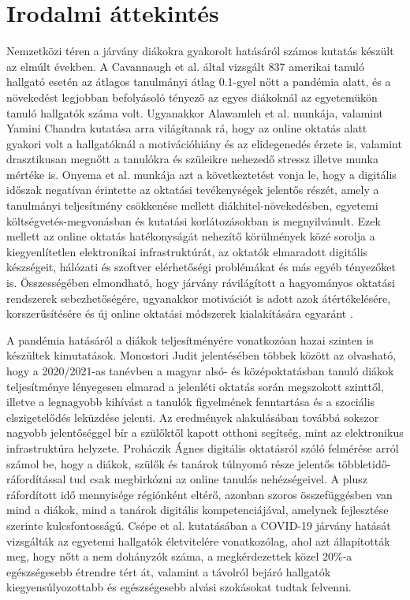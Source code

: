 \documentclass[12pt]{article}
\begin{document}
\newpage

\section{Irodalmi áttekintés}

Nemzetközi téren a járvány diákokra gyakorolt hatásáról számos kutatás készült az elmúlt években. A Cavannaugh et al. \cite{student_perf1} által vizsgált 837 amerikai tanuló hallgató esetén az átlagos tanulmányi átlag 0.1-gyel nőtt a pandémia alatt, és a növekedést legjobban befolyásoló tényező az egyes diákoknál az egyetemükön tanuló hallgatók száma volt. Ugyanakkor Alawamleh et al. \cite{student_perf8} munkája, valamint Yamini Chandra \cite{student_perf6} kutatása arra világítanak rá, hogy az online oktatás alatt gyakori volt a hallgatóknál a motivációhiány és az elidegenedés érzete is, valamint drasztikusan megnőtt a tanulókra és szüleikre nehezedő stressz illetve munka mértéke is.
Onyema et al. \cite{student_perf5} munkája azt a következtetést vonja le, hogy a digitális időszak negatívan érintette az oktatási tevékenységek jelentős részét, amely a tanulmányi teljesítmény csökkenése mellett diákhitel-növekedésben, egyetemi költségvetés-megvonásban és kutatási korlátozásokban is megnyilvánult. Ezek mellett az online oktatás hatékonyságát nehezítő körülmények közé sorolja a kiegyenlítetlen elektronikai infrastruktúrát, az oktatók elmaradott digitális készségeit, hálózati és szoftver elérhetőségi problémákat és más egyéb tényezőket is.
Összességében elmondható, hogy járvány rávilágított a hagyományos oktatási rendszerek sebezhetőségére, ugyanakkor motivációt is adott azok átértékelésére, korszerűsítésére és új online oktatási módszerek kialakítására egyaránt \cite{student_perf7, student_perf9}. 

A pandémia hatásáról a diákok teljesítményére vonatkozóan hazai szinten is készültek kimutatások. Monostori Judit \cite{magyar1} jelentésében többek között az olvasható, hogy a 2020/2021-as tanévben a magyar alsó- és középoktatásban tanuló diákok teljesítménye lényegesen elmarad a jelenléti oktatás során megszokott szinttől, illetve a legnagyobb kihívást a tanulók figyelmének fenntartása és a szociális elszigetelődés leküzdése jelenti. Az eredmények alakulásában továbbá sokszor nagyobb jelentőséggel bír a szülőktől kapott otthoni segítség, mint az elektronikus infrastruktúra helyzete.
Proháczik Ágnes \cite{magyar2} digitális oktatásról szóló felmérése arról számol be, hogy  a diákok, szülők és tanárok túlnyomó része jelentős többletidő-ráfordítással tud csak megbirkózni az online tanulás nehézségeivel. A plusz ráfordított idő mennyisége régiónként eltérő, azonban szoros összefüggésben van mind a diákok, mind a tanárok digitális kompetenciájával, amelynek fejlesztése szerinte kulcsfontosságú. 
Csépe et al. \cite{magyar3} kutatásában a COVID-19 járvány hatását vizsgálták az egyetemi hallgatók életvitelére vonatkozólag, ahol azt állapították meg, hogy nőtt a nem dohányzók száma, a megkérdezettek közel 20\%-a egészségesebb étrendre tért át, valamint a távolról bejáró hallgatók kiegyensúlyozottabb és egészségesebb alvási szokásokat tudtak felvenni.
\end{document}
